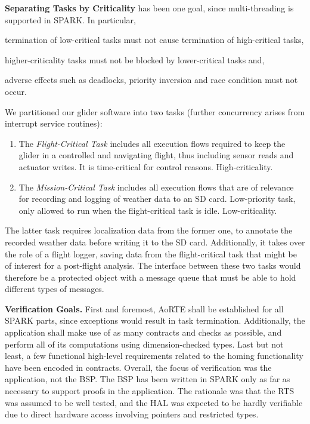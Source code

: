 \textbf{Separating Tasks by Criticality\label{sec:separ-tasks-crit}}
has been one goal, since multi-threading is supported in
SPARK. In particular, \begin{inparaenum}
\item termination of low-critical tasks must not cause termination of
  high-critical tasks,
\item higher-criticality tasks must not be blocked by lower-critical tasks and,
\item adverse effects such as deadlocks,
priority inversion and race condition must not occur. 
\end{inparaenum}
We partitioned our glider software into two tasks (further concurrency arises
from interrupt service routines):
\begin{enumerate}
\item The \emph{Flight-Critical Task} includes all execution flows
  required to keep the glider in a controlled and
  navigating flight, thus including sensor reads and actuator
  writes. It is time-critical for control reasons. High-criticality.
\item The \emph{Mission-Critical Task} includes all execution flows that
  are of relevance for recording and logging of weather data to an SD
  card. Low-priority task, only allowed to run when the
  flight-critical task is idle. Low-criticality.
\end{enumerate}
%
The latter task requires localization data from the former one, to
annotate the recorded weather data before writing it to the SD card.
Additionally, it takes over the role of a flight logger, saving data
from the flight-critical task that might be of interest for a
post-flight analysis. The interface between these two tasks would
therefore be a protected object with a message queue that must be
able to hold different types of messages. 

\textbf{Verification Goals.} First and foremost, AoRTE shall be
established for all SPARK parts, since exceptions would result in task
termination. Additionally, the application shall make use of as many
contracts and checks as possible, and perform all of its computations using
dimension-checked types. Last but not least, a few functional high-level
requirements related to the homing functionality have been encoded in
contracts.
%
Overall, the focus of verification was the application, not the
BSP. The BSP has been written in SPARK only as far as necessary to 
support proofs in the application. The rationale was that the RTS was assumed to
be well tested, and the HAL was expected to be hardly verifiable
due to direct hardware access involving pointers and restricted types.

